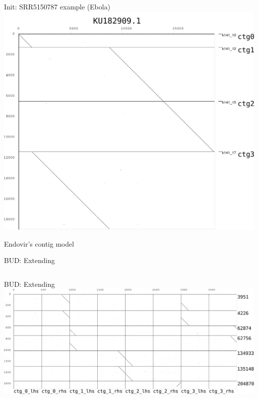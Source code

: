 \documentclass{beamer}
\begin{document}
  \begin{frame}{Init: SRR5150787 example (Ebola)}
    \includegraphics[width=0.9\linewidth]{figs/ebovexample/ebov_contigs.pdf}
  \end{frame}

  \begin{frame}{Endovir's contig model}
    \resizebox{\linewidth}{!}{}
  \end{frame}

  \begin{frame}{BUD: Extending}
    \begin{columns}
      \begin{column}{0.5\textwidth}
        
      \end{column}
      \begin{column}{0.5\textwidth}
        
      \end{column}
    \end{columns}
  \end{frame}

  \begin{frame}{BUD: Extending}
    \includegraphics[width=0.9\linewidth]{figs/ebovexample/flanks/flankext.pdf}
    
  \end{frame}
\end{document}
